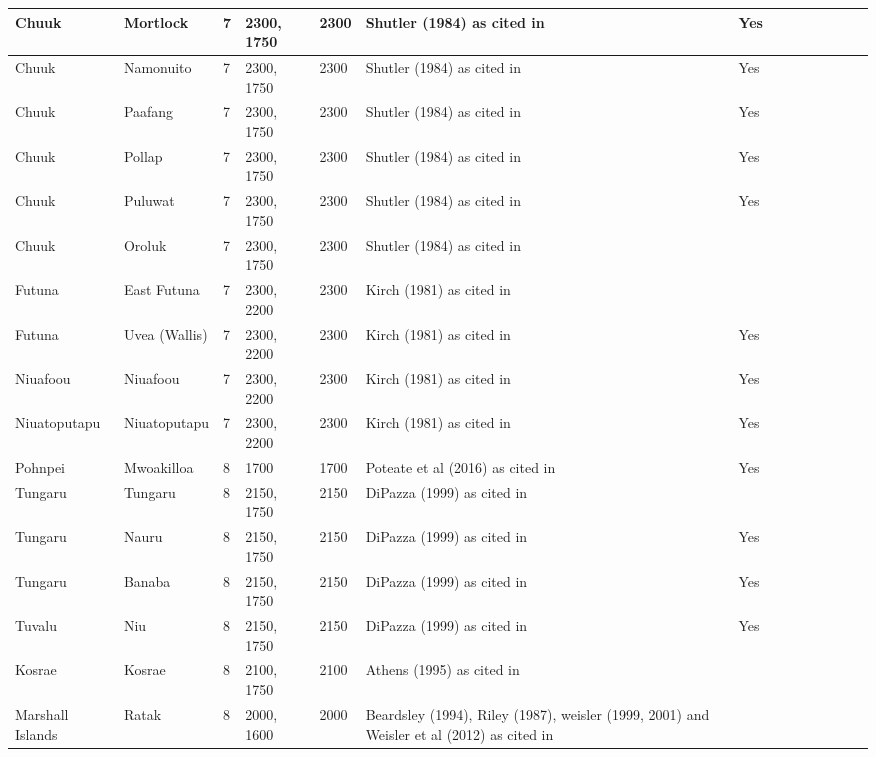 \documentclass[a4paper,10pt]{article} %
\begin{document}
\begin{landscape}
\begin{longtable}{| p{3cm}| p{4cm}| p{4cm}|p{2cm}|p{2cm}|p{2cm}|p{2cm}|p{2cm}|p{2cm}|p{2cm}|p{2cm}|p{2cm}|p{2cm}|p{2cm}}
 Chuuk & Mortlock & 7 & 2300, 1750 & 2300 & Shutler (1984) as cited in \citet{rieth_cochrane_2018} & Yes \\ \hline
 Chuuk & Namonuito & 7 & 2300, 1750 & 2300 & Shutler (1984) as cited in \citet{rieth_cochrane_2018} & Yes \\ \hline
 Chuuk & Paafang & 7 & 2300, 1750 & 2300 & Shutler (1984) as cited in \citet{rieth_cochrane_2018} & Yes \\ \hline
 Chuuk & Pollap & 7 & 2300, 1750 & 2300 & Shutler (1984) as cited in \citet{rieth_cochrane_2018} & Yes \\ \hline
 Chuuk & Puluwat & 7 & 2300, 1750 & 2300 & Shutler (1984) as cited in \citet{rieth_cochrane_2018} & Yes \\ \hline
 Chuuk & Oroluk & 7 & 2300, 1750 & 2300 & Shutler (1984) as cited in \citet{rieth_cochrane_2018} &   \\ \hline
 Futuna & East Futuna & 7 & 2300, 2200 & 2300 & Kirch (1981) as cited in \citet{rieth_cochrane_2018} &   \\ \hline
 Futuna & Uvea (Wallis) & 7 & 2300, 2200 & 2300 & Kirch (1981) as cited in \citet{rieth_cochrane_2018} & Yes \\ \hline
 Niuafoou & Niuafoou & 7 & 2300, 2200 & 2300 & Kirch (1981) as cited in \citet{rieth_cochrane_2018} & Yes \\ \hline
 Niuatoputapu & Niuatoputapu & 7 & 2300, 2200 & 2300 & Kirch (1981) as cited in \citet{rieth_cochrane_2018} & Yes \\ \hline
 Pohnpei & Mwoakilloa & 8 & 1700 & 1700 & Poteate et al (2016) as cited in \citet{levin_seikel_miles_2019} & Yes \\ \hline
 Tungaru & Tungaru & 8 & 2150, 1750 & 2150 & DiPazza (1999) as cited in \citet{rieth_cochrane_2018} &   \\ \hline
 Tungaru & Nauru & 8 & 2150, 1750 & 2150 & DiPazza (1999) as cited in \citet{rieth_cochrane_2018} & Yes \\ \hline
 Tungaru & Banaba & 8 & 2150, 1750 & 2150 & DiPazza (1999) as cited in \citet{rieth_cochrane_2018} & Yes \\ \hline
 Tuvalu & Niu & 8 & 2150, 1750 & 2150 & DiPazza (1999) as cited in \citet{rieth_cochrane_2018} & Yes \\ \hline
 Kosrae & Kosrae & 8 & 2100, 1750 & 2100 & Athens (1995) as cited in \citet{rieth_cochrane_2018} &   \\ \hline
 Marshall Islands & Ratak & 8 & 2000, 1600 & 2000 & Beardsley (1994), Riley (1987), weisler (1999, 2001) and Weisler et al (2012) as cited in \citet{rieth_cochrane_2018} &   \\ \hline

\end{longtable}
\end{landscape}
\end{document}
